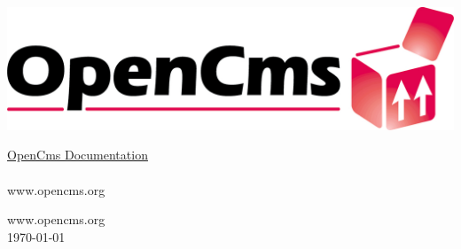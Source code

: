 
\begin{titlepage}
\begin{flushright}
  \includegraphics[width=0.4\linewidth]{pics/logo}
\end{flushright}
\vspace{8cm}
\Huge
\titleFont \underline{OpenCms Documentation}\\
\\
\vfill
\normalsize
www.opencms.org
\end{titlepage}

\newpage
\thispagestyle{empty}
\vspace*{\fill}
www.opencms.org\\
\today

